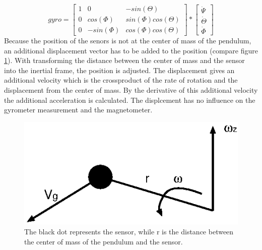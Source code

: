 \begin{equation}\label{deuler2body}
gyro=\begin{bmatrix} 1 & 0 & -sin(\Theta) \\ 0 & cos(\Phi) & sin(\Phi) cos(\Theta) \\ 0 & -sin(\Phi) & cos(\Phi)cos(\Theta) \end{bmatrix}*\begin{bmatrix} \dot{\Psi}\\ \dot{\Theta}\\ \dot{\Phi} \end{bmatrix}
\end{equation}
Because the position of the senors is not at the center of mass of the pendulum, an additional displacement vector has to be added to the position (compare figure \ref{displacement}). With transforming the distance between the center of mass and the sensor into the inertial frame, the position is adjusted. The displacement gives an additional velocity which is the crossproduct of the rate of rotation and the displacement from the center of mass. By the derivative of this additional velocity the additional acceleration is calculated. The displcement has no influence on the gyrometer measurement and the magnetometer.
\begin{figure}[h]
\begin{center}
\includegraphics[width=8 cm]{pictures/displacement_1.eps}
\caption{The black dot represents the sensor, while r is the distance between the center of mass of the pendulum and the sensor.}
\label{displacement}
\end{center}
\end{figure}

